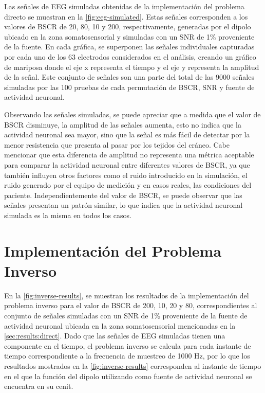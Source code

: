 Las señales de EEG simuladas obtenidas de la implementación del problema directo se muestran en la \cref{fig:eeg-simulated}. 
Estas señales corresponden a los valores de BSCR de 20, 80, 10 y 200, respectivamente, generadas por el dipolo ubicado en la zona somatosensorial y simuladas con un SNR de 1\% proveniente de la fuente.
En cada gráfica, se superponen las señales individuales capturadas por cada uno de los 63 electrodos considerados en el análisis, creando un gráfico de mariposa donde el eje x representa el tiempo y el eje y representa la amplitud de la señal. 
Este conjunto de señales son una parte del total de las 9000 señales simuladas por las 100 pruebas de cada permutación de BSCR, SNR y fuente de actividad neuronal.

Observando las señales simuladas, se puede apreciar que a medida que el valor de BSCR disminuye, la amplitud de las señales aumenta, esto no indica que la actividad neuronal sea mayor, sino que la señal es más fácil de detectar por la menor resistencia que presenta al pasar por los tejidos del cráneo.
Cabe mencionar que esta diferencia de amplitud no representa una métrica aceptable para comparar la actividad neuronal entre diferentes valores de BSCR, ya que también influyen otros factores como el ruido introducido en la simulación, el ruido generado por el equipo de medición y en casos reales, las condiciones del paciente.
Independientemente del valor de BSCR, se puede observar que las señales presentan un patrón similar, lo que indica que la actividad neuronal simulada es la misma en todos los casos.

\section{Implementación del Problema Inverso}
\label{sec:results:inverse}

En la \cref{fig:inverse-results}, se muestran los resultados de la implementación del problema inverso para el valor de BSCR de 200, 10, 20 y 80, correspondientes al conjunto de señales simuladas con un SNR de 1\% proveniente de la fuente de actividad neuronal ubicada en la zona somatosensorial mencionadas en la \cref{sec:results:direct}.
Dado que las señales de EEG simuladas tienen una componente en el tiempo, el problema inverso se calcula para cada instante de tiempo correspondiente a la frecuencia de muestreo de 1000 Hz, por lo que los resultados mostrados en la \cref{fig:inverse-results} corresponden al instante de tiempo en el que la función del dipolo utilizando como fuente de actividad neuronal se encuentra en su cenit.

